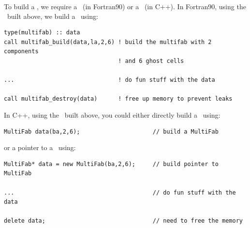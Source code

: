To build a \MultiFab, we require a \layout\ (in Fortran90) or a \BoxArray\ (in C++).
In Fortran90, using the \layout\ built above, we build a \MultiFab\ using:
\begin{lstlisting}[backgroundcolor=\color{light-green}]
type(multifab) :: data
call multifab_build(data,la,2,6) ! build the multifab with 2 components 
                                 ! and 6 ghost cells

...                              ! do fun stuff with the data

call multifab_destroy(data)      ! free up memory to prevent leaks
\end{lstlisting}
In C++, using the \BoxArray\ built above, you could either directly 
build a \MultiFab\ using:
\begin{lstlisting}[backgroundcolor=\color{light-blue}]
MultiFab data(ba,2,6);                     // build a MultiFab
\end{lstlisting}
or a pointer to a \MultiFab\ using:
\begin{lstlisting}[backgroundcolor=\color{light-blue}]
MultiFab* data = new MultiFab(ba,2,6);     // build pointer to MultiFab

...                                        // do fun stuff with the data

delete data;                               // need to free the memory
\end{lstlisting}

